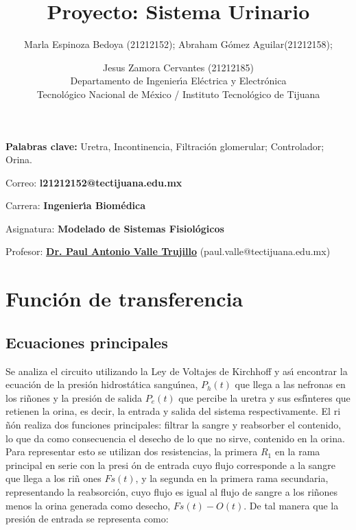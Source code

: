 \documentclass[letterpaper,11pt]{article}
\begin{document}
\title{Proyecto: Sistema Urinario}
\author{Marla Espinoza Bedoya (21212152); Abraham G\'{o}mez
Aguilar(21212158); \and Jesus Zamora Cervantes (21212185) \\
Departamento de Ingenier\'{\i}a El\'{e}ctrica y Electr\'{o}nica\\
Tecnol\'{o}gico Nacional de M\'{e}xico / Instituto Tecnol\'{o}gico de Tijuana%
}
\maketitle

\noindent \textbf{Palabras clave:} Uretra, Incontinencia, Filtraci\'{o}n
glomerular; Controlador; Orina.

\noindent Correo: \textbf{l21212152@tectijuana.edu.mx}

\noindent \noindent Carrera: \textbf{Ingenier\'{\i}a Biom\'{e}dica}

\noindent Asignatura: \textbf{Modelado de Sistemas Fisiol\'{o}gicos}

\noindent Profesor: \href{https://biomath.xyz/}{\textbf{Dr. Paul Antonio
Valle Trujillo}} (paul.valle@tectijuana.edu.mx)

\section{Funci\'{o}n de transferencia}

\subsection{Ecuaciones principales}

Se analiza el circuito utilizando la Ley de Voltajes de Kirchhoff y as\'{\i}
encontrar la ecuaci\'{o}n de la presi\'{o}n hidrost\'{a}tica sangu\'{\i}nea, 
$P_{h}(t)$ que llega a las nefronas en los ri\~{n}ones y la presi\'{o}n de
salida $P_{e}(t)$ que percibe la uretra y sus esf\'{\i}nteres que retienen
la orina, es decir, la entrada y salida del sistema respectivamente. El ri%
\~{n}\'{o}n realiza dos funciones principales: filtrar la sangre y
reabsorber el contenido, lo que da como consecuencia el desecho de lo que no
sirve, contenido en la orina. Para representar esto se utilizan dos
resistencias, la primera $R_{1}$ en la rama principal en serie con la presi%
\'{o}n de entrada cuyo flujo corresponde a la sangre que llega a los ri\~{n}%
ones $Fs(t)$, y la segunda en la primera rama secundaria, representando la
reabsorci\'{o}n, cuyo flujo es igual al flujo de sangre a los ri\~{n}ones
menos la orina generada como desecho, $Fs(t)-O(t).$ De tal manera que la
presi\'{o}n de entrada se representa como:
\end{document}
